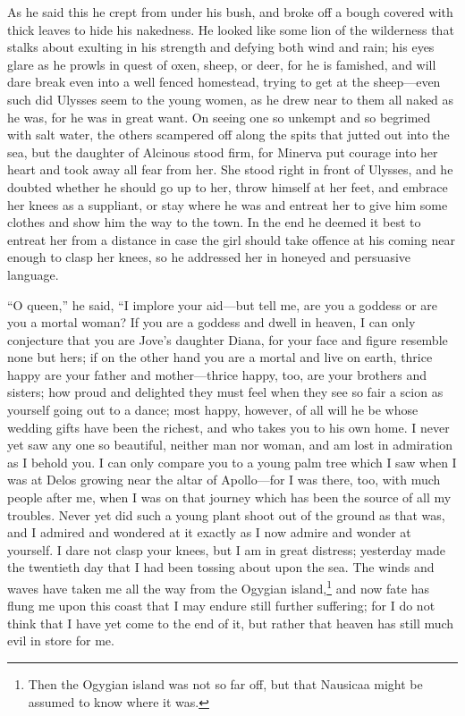 As he said this he crept from under his bush, and broke off a bough covered
with thick leaves to hide his nakedness. He looked like some lion of the
wilderness that stalks about exulting in his strength and defying both wind and
rain; his eyes glare as he prowls in quest of oxen, sheep, or deer, for he is
famished, and will dare break even into a well fenced homestead, trying to get
at the sheep—even such did Ulysses seem to the young women, as he drew near to
them all naked as he was, for he was in great want. On seeing one so unkempt
and so begrimed with salt water, the others scampered off along the spits that
jutted out into the sea, but the daughter of Alcinous stood firm, for Minerva
put courage into her heart and took away all fear from her. She stood right in
front of Ulysses, and he doubted whether he should go up to her, throw himself
at her feet, and embrace her knees as a suppliant, or stay where he was and
entreat her to give him some clothes and show him the way to the town. In the
end he deemed it best to entreat her from a distance in case the girl should
take offence at his coming near enough to clasp her knees, so he addressed her
in honeyed and persuasive language.

“O queen,” he said, “I implore your aid—but tell me, are you a goddess or are
you a mortal woman? If you are a goddess and dwell in heaven, I can only
conjecture that you are Jove’s daughter Diana, for your face and figure
resemble none but hers; if on the other hand you are a mortal and live on
earth, thrice happy are your father and mother—thrice happy, too, are your
brothers and sisters; how proud and delighted they must feel when they see so
fair a scion as yourself going out to a dance; most happy, however, of all will
he be whose wedding gifts have been the richest, and who takes you to his own
home. I never yet saw any one so beautiful, neither man nor woman, and am lost
in admiration as I behold you. I can only compare you to a young palm tree
which I saw when I was at Delos growing near the altar of Apollo—for I was
there, too, with much people after me, when I was on that journey which has
been the source of all my troubles. Never yet did such a young plant shoot out
of the ground as that was, and I admired and wondered at it exactly as I now
admire and wonder at yourself. I dare not clasp your knees, but I am in great
distress; yesterday made the twentieth day that I had been tossing about upon
the sea. The winds and waves have taken me all the way from the Ogygian
island,\footnote{Then the Ogygian island was not so far off, but that Nausicaa might be
assumed to know where it was.} and now
fate has flung me upon this coast that I may endure still further suffering;
for I do not think that I have yet come to the end of it, but rather that
heaven has still much evil in store for me.

